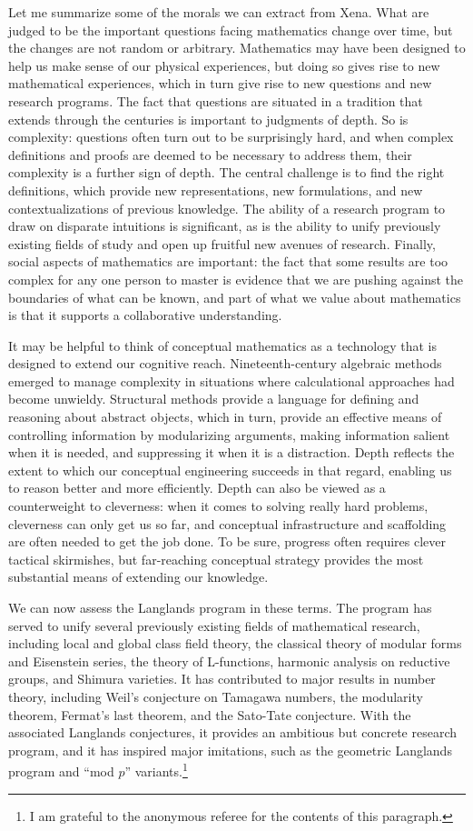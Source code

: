 \documentclass{amsart}
\theoremstyle{definition}
\theoremstyle{remark}
\numberwithin{equation}{section}
\begin{document}
Let me summarize some of the morals we can extract from Xena. What are judged to be the important questions facing mathematics change over time, but the changes are not random or arbitrary. Mathematics may have been designed to help us make sense of our physical experiences, but doing so gives rise to new mathematical experiences, which in turn give rise to new questions and new research programs. The fact that questions are situated in a tradition that extends through the centuries is important to judgments of depth. So is complexity: questions often turn out to be surprisingly hard, and when complex definitions and proofs are deemed to be necessary to address them, their complexity is a further sign of depth. The central challenge is to find the right definitions, which provide new representations, new formulations, and new contextualizations of previous knowledge. The ability of a research program to draw on disparate intuitions is significant, as is the ability to unify previously existing fields of study and open up fruitful new avenues of research. Finally, social aspects of mathematics are important: the fact that some results are too complex for any one person to master is evidence that we are pushing against the boundaries of what can be known, and part of what we value about mathematics is that it supports a collaborative understanding.

It may be helpful to think of conceptual mathematics as a technology that is designed to extend our cognitive reach. Nineteenth-century algebraic methods emerged to manage complexity in situations where calculational approaches had become unwieldy. Structural methods provide a language for defining and reasoning about abstract objects, which in turn, provide an effective means of controlling information by modularizing arguments, making information salient when it is needed, and suppressing it when it is a distraction. Depth reflects the extent to which our conceptual engineering succeeds in that regard, enabling us to reason better and more efficiently. Depth can also be viewed as a counterweight to cleverness: when it comes to solving really hard problems, cleverness can only get us so far, and conceptual infrastructure and scaffolding are often needed to get the job done. To be sure, progress often requires clever tactical skirmishes, but far-reaching conceptual strategy provides the most substantial means of extending our knowledge.

We can now assess the Langlands program in these terms. The program has served to unify several previously existing fields of mathematical research, including local and global class field theory, the classical theory of modular forms and Eisenstein series, the theory of L-functions, harmonic analysis on reductive groups, and Shimura varieties. It has contributed to major results in number theory, including Weil's conjecture on Tamagawa numbers, the modularity theorem, Fermat's last theorem, and the Sato-Tate conjecture. With the associated Langlands conjectures, it provides an ambitious but concrete research program, and it has inspired major imitations, such as the geometric Langlands program and ``mod $p$'' variants.\footnote{I am grateful to the anonymous referee for the contents of this paragraph.}
\end{document}
